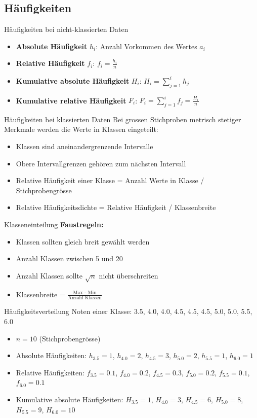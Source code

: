 \subsection{Häufigkeiten}
\begin{definition}{Häufigkeiten bei nicht-klassierten Daten}
\begin{itemize}
    \item \textbf{Absolute Häufigkeit} $h_i$: Anzahl Vorkommen des Wertes $a_i$
    \item \textbf{Relative Häufigkeit} $f_i$: $f_i = \frac{h_i}{n}$
    \item \textbf{Kumulative absolute Häufigkeit} $H_i$: $H_i = \sum_{j=1}^i h_j$
    \item \textbf{Kumulative relative Häufigkeit} $F_i$: $F_i = \sum_{j=1}^i f_j = \frac{H_i}{n}$
\end{itemize}
\end{definition}

\begin{definition}{Häufigkeiten bei klassierten Daten}
Bei grossen Stichproben metrisch stetiger Merkmale werden die Werte in Klassen eingeteilt:
\begin{itemize}
    \item Klassen sind aneinandergrenzende Intervalle
    \item Obere Intervallgrenzen gehören zum nächsten Intervall
    \item Relative Häufigkeit einer Klasse = Anzahl Werte in Klasse / Stichprobengrösse
    \item Relative Häufigkeitsdichte = Relative Häufigkeit / Klassenbreite
\end{itemize}
\end{definition}

\begin{KR}{Klasseneinteilung}
\textbf{Faustregeln:}
\begin{itemize}
    \item Klassen sollten gleich breit gewählt werden
    \item Anzahl Klassen zwischen 5 und 20
    \item Anzahl Klassen sollte $\sqrt{n}$ nicht überschreiten
    \item Klassenbreite = $\frac{\text{Max - Min}}{\text{Anzahl Klassen}}$
\end{itemize}
\end{KR}

\begin{example2}{Häufigkeitsverteilung}
Noten einer Klasse: 3.5, 4.0, 4.0, 4.5, 4.5, 4.5, 5.0, 5.0, 5.5, 6.0
\begin{itemize}
    \item $n = 10$ (Stichprobengrösse)
    \item Absolute Häufigkeiten: $h_{3.5}=1$, $h_{4.0}=2$, $h_{4.5}=3$, $h_{5.0}=2$, $h_{5.5}=1$, $h_{6.0}=1$
    \item Relative Häufigkeiten: $f_{3.5}=0.1$, $f_{4.0}=0.2$, $f_{4.5}=0.3$, $f_{5.0}=0.2$, $f_{5.5}=0.1$, $f_{6.0}=0.1$
    \item Kumulative absolute Häufigkeiten: $H_{3.5}=1$, $H_{4.0}=3$, $H_{4.5}=6$, $H_{5.0}=8$, $H_{5.5}=9$, $H_{6.0}=10$
\end{itemize}
\end{example2}